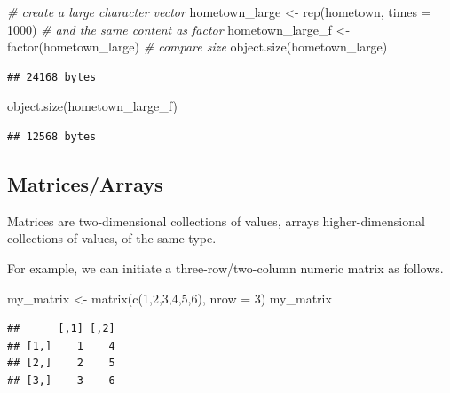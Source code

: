 \documentclass[
  12pt,
]{style/krantz}
\newenvironment{Shaded}{\begin{snugshade}}{\end{snugshade}}
\newcommand{\AttributeTok}[1]{\textcolor[rgb]{0.77,0.63,0.00}{#1}}
\newcommand{\CommentTok}[1]{\textcolor[rgb]{0.56,0.35,0.01}{\textit{#1}}}
\newcommand{\DecValTok}[1]{\textcolor[rgb]{0.00,0.00,0.81}{#1}}
\newcommand{\FunctionTok}[1]{\textcolor[rgb]{0.00,0.00,0.00}{#1}}
\newcommand{\NormalTok}[1]{#1}
\newcommand{\OtherTok}[1]{\textcolor[rgb]{0.56,0.35,0.01}{#1}}
\begin{document}
\begin{Shaded}
\begin{Highlighting}[]
\CommentTok{\# create a large character vector}
\NormalTok{hometown\_large }\OtherTok{\textless{}{-}} \FunctionTok{rep}\NormalTok{(hometown, }\AttributeTok{times =} \DecValTok{1000}\NormalTok{)}
\CommentTok{\# and the same content as factor}
\NormalTok{hometown\_large\_f }\OtherTok{\textless{}{-}} \FunctionTok{factor}\NormalTok{(hometown\_large)}
\CommentTok{\# compare size}
\FunctionTok{object.size}\NormalTok{(hometown\_large)}
\end{Highlighting}
\end{Shaded}

\begin{verbatim}
## 24168 bytes
\end{verbatim}

\begin{Shaded}
\begin{Highlighting}[]
\FunctionTok{object.size}\NormalTok{(hometown\_large\_f)}
\end{Highlighting}
\end{Shaded}

\begin{verbatim}
## 12568 bytes
\end{verbatim}

\hypertarget{matricesarrays}{%
\subsection{Matrices/Arrays}\label{matricesarrays}}

Matrices are two-dimensional collections of values, arrays higher-dimensional collections of values, of the same type.

For example, we can initiate a three-row/two-column numeric matrix as follows.

\begin{Shaded}
\begin{Highlighting}[]
\NormalTok{my\_matrix }\OtherTok{\textless{}{-}} \FunctionTok{matrix}\NormalTok{(}\FunctionTok{c}\NormalTok{(}\DecValTok{1}\NormalTok{,}\DecValTok{2}\NormalTok{,}\DecValTok{3}\NormalTok{,}\DecValTok{4}\NormalTok{,}\DecValTok{5}\NormalTok{,}\DecValTok{6}\NormalTok{), }\AttributeTok{nrow =} \DecValTok{3}\NormalTok{)}
\NormalTok{my\_matrix}
\end{Highlighting}
\end{Shaded}

\begin{verbatim}
##      [,1] [,2]
## [1,]    1    4
## [2,]    2    5
## [3,]    3    6
\end{verbatim}
\end{document}
